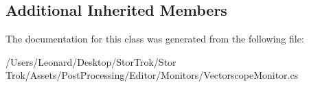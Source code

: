 \subsection*{Additional Inherited Members}


The documentation for this class was generated from the following file\+:\begin{DoxyCompactItemize}
\item 
/\+Users/\+Leonard/\+Desktop/\+Stor\+Trok/\+Stor Trok/\+Assets/\+Post\+Processing/\+Editor/\+Monitors/Vectorscope\+Monitor.\+cs\end{DoxyCompactItemize}
